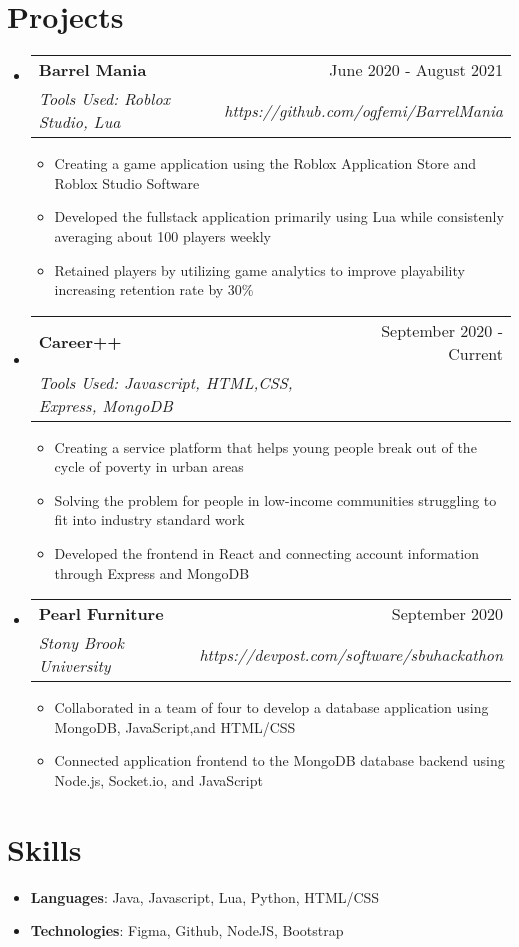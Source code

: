 \documentclass[letterpaper,11pt]{article}
\makeatletter
\newcommand{\resumeItem}[2]{
  \item\small{
    \textbf{#1}{: #2 \vspace{-2pt}}
  }
}
\newcommand{\resumeSubheading}[4]{
  \vspace{-1pt}\item
    \begin{tabular*}{0.97\textwidth}[t]{l@{\extracolsep{\fill}}r}
      \textbf{#1} & #2 \\
      \textit{\small#3} & \textit{\small #4} \\
    \end{tabular*}\vspace{-5pt}
}
\newcommand{\resumeSubItem}[2]{\resumeItem{#1}{#2}\vspace{-4pt}}
\newcommand{\resumeSubHeadingListStart}{\begin{itemize}[leftmargin=*]}
\newcommand{\resumeSubHeadingListEnd}{\end{itemize}}
\makeatother
\begin{document}
\section{Projects}
  \resumeSubHeadingListStart
    \resumeSubheading
      {Barrel Mania}{June 2020 - August 2021}
      {Tools Used: Roblox Studio, Lua }{https://github.com/ogfemi/BarrelMania}
      {\begin{itemize}
        \item Creating a game application using the Roblox Application Store and Roblox Studio Software
        \item Developed the fullstack application primarily using Lua while consistenly averaging about 100 players weekly
        \item Retained players by utilizing game analytics to improve playability increasing retention rate by 30\%
      \end{itemize}
      }
    \resumeSubheading
      {Career++}{September 2020 - Current}
      {Tools Used: Javascript, HTML,CSS, Express, MongoDB}{}
      {\begin{itemize}
        \item Creating a service platform that helps young people break out of the cycle of poverty in urban areas
        \item Solving the problem for people in low-income communities struggling to fit into industry standard work
        \item Developed the frontend in React and connecting account information through Express and MongoDB
      \end{itemize}
      }
    \resumeSubheading
      {Pearl Furniture}{September 2020}
      {Stony Brook University}{https://devpost.com/software/sbuhackathon}
      {\begin{itemize}
        \item Collaborated in a team of four to develop a database application using MongoDB, JavaScript,and HTML/CSS
        \item Connected application frontend to the MongoDB database backend using Node.js, Socket.io, and JavaScript
      \end{itemize}
      }
  \resumeSubHeadingListEnd

  \section{Skills}
  \resumeSubHeadingListStart
    \resumeSubItem{Languages}
      {Java, Javascript, Lua, Python, HTML/CSS}
      \resumeSubItem{Technologies}
      {Figma, Github, NodeJS, Bootstrap}
   \resumeSubHeadingListEnd



\end{document}
